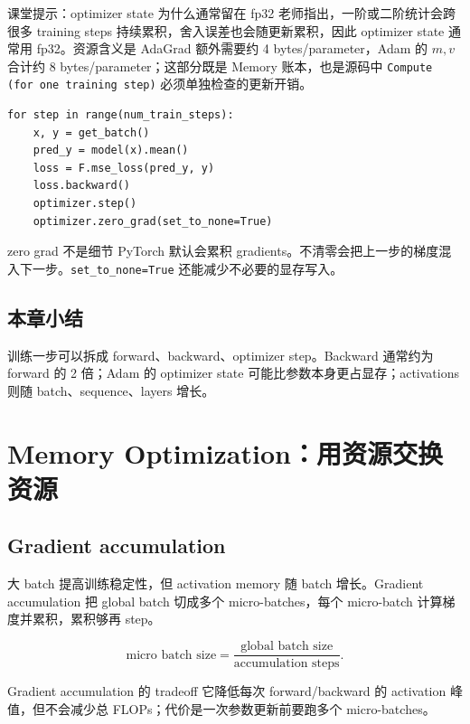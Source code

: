 \documentclass[a4paper]{article}
\begin{document}
\begin{knowledgebox}{课堂提示：optimizer state 为什么通常留在 fp32}
老师指出，一阶或二阶统计会跨很多 training steps 持续累积，舍入误差也会随更新累积，因此 optimizer state 通常用 fp32。资源含义是 AdaGrad 额外需要约 4 bytes/parameter，Adam 的 \(m,v\) 合计约 8 bytes/parameter；这部分既是 Memory 账本，也是源码中 \texttt{Compute (for one training step)} 必须单独检查的更新开销。
\end{knowledgebox}

\begin{lstlisting}[caption={最小训练循环}]
for step in range(num_train_steps):
    x, y = get_batch()
    pred_y = model(x).mean()
    loss = F.mse_loss(pred_y, y)
    loss.backward()
    optimizer.step()
    optimizer.zero_grad(set_to_none=True)
\end{lstlisting}

\begin{warningbox}{zero grad 不是细节}
PyTorch 默认会累积 gradients。不清零会把上一步的梯度混入下一步。\texttt{set\_to\_none=True} 还能减少不必要的显存写入。
\end{warningbox}

\subsection{本章小结}

训练一步可以拆成 forward、backward、optimizer step。Backward 通常约为 forward 的 2 倍；Adam 的 optimizer state 可能比参数本身更占显存；activations 则随 batch、sequence、layers 增长。

\section{Memory Optimization：用资源交换资源}

\subsection{Gradient accumulation}

大 batch 提高训练稳定性，但 activation memory 随 batch 增长。Gradient accumulation 把 global batch 切成多个 micro-batches，每个 micro-batch 计算梯度并累积，累积够再 step。

\[
\text{micro batch size}=\frac{\text{global batch size}}{\text{accumulation steps}}.
\]

\begin{importantbox}{Gradient accumulation 的 tradeoff}
它降低每次 forward/backward 的 activation 峰值，但不会减少总 FLOPs；代价是一次参数更新前要跑多个 micro-batches。
\end{importantbox}
\end{document}
